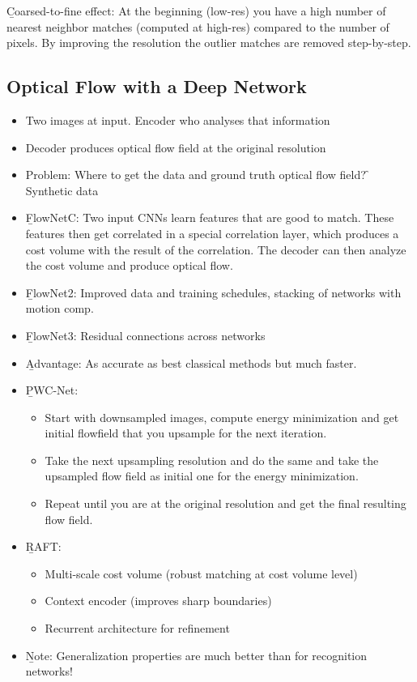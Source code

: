 \b{Coarsed-to-fine effect:} At the beginning (low-res) you have a high number of nearest neighbor matches (computed at high-res) compared to the number of pixels. By improving the resolution the outlier matches are removed step-by-step.

\subsection{Optical Flow with a Deep Network}
\begin{itemize}
    \item Two images at input. Encoder who analyses that information
    \item Decoder produces optical flow field at the original resolution
    \item Problem: Where to get the data and ground truth optical flow field? \f{\to} Synthetic data
    \item \b{FlowNetC:} Two input CNNs learn features that are good to match. These features then get correlated in a special correlation layer, which produces a cost volume with the result of the correlation. The decoder can then analyze the cost volume and produce optical flow.
    \item \b{FlowNet2:} Improved data and training schedules, stacking of networks with motion comp.
    \item \b{FlowNet3:} Residual connections across networks
    \item \b{Advantage:} As accurate as best classical methods but much faster.
    \item \b{PWC-Net:}
    \begin{itemize}
        \item Start with downsampled images, compute energy minimization and get initial flowfield that you upsample for the next iteration.
        \item Take the next upsampling resolution and do the same and take the upsampled flow field as initial one for the energy      minimization.
        \item Repeat until you are at the original resolution and get the final resulting flow field.
    \end{itemize}
    \item \b{RAFT:}
    \begin{itemize}
        \item Multi-scale cost volume (robust matching at cost volume level)
        \item Context encoder (improves sharp boundaries)
        \item Recurrent architecture for refinement
    \end{itemize}
    \item \b{Note:} Generalization properties are much better than for recognition networks!
\end{itemize}

\newpage